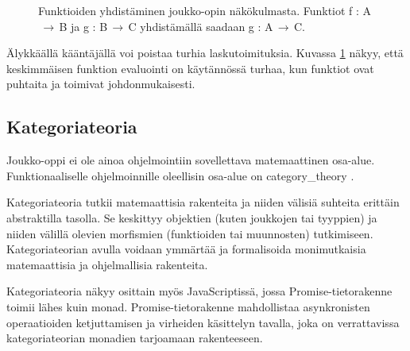 \begin{figure}[htbp]
    \vspace{10pt}
    \caption{Funktioiden yhdistäminen joukko-opin näkökulmasta. Funktiot f : A$\,\to\,$B ja g : B$\,\to\,$C yhdistämällä saadaan g : A$\,\to\,$C.}
    \label{fig:function_composition_in_sets}
\end{figure}

Älykkäällä kääntäjällä voi poistaa turhia laskutoimituksia. Kuvassa \ref{fig:function_composition_in_sets} näkyy, että keskimmäisen funktion evaluointi on käytännössä turhaa, kun funktiot ovat puhtaita ja toimivat johdonmukaisesti.



\subsection{Kategoriateoria}


Joukko-oppi ei ole ainoa ohjelmointiin sovellettava matemaattinen osa-alue. Funktionaaliselle ohjelmoinnille oleellisin osa-alue on \gls{category_theory} \cite{bartosz_category_for_progamers,promises-spec-94}.

Kategoriateoria tutkii matemaattisia rakenteita ja niiden välisiä suhteita erittäin abstraktilla tasolla. Se keskittyy objektien (kuten joukkojen tai tyyppien) ja niiden välillä olevien morfismien (funktioiden tai muunnosten) tutkimiseen. Kategoriateorian avulla voidaan ymmärtää ja formalisoida monimutkaisia matemaattisia ja ohjelmallisia rakenteita. \citep{bartosz_category_for_progamers,promises-spec-94,category_theory}

Kategoriateoria näkyy osittain myös JavaScriptissä, jossa Promise-tietorakenne toimii lähes kuin \gls{monad}. Promise-tietorakenne mahdollistaa asynkronisten operaatioiden ketjuttamisen ja virheiden käsittelyn tavalla, joka on verrattavissa kategoriateorian monadien tarjoamaan rakenteeseen. \citep{promises-spec-94,stackoverflow:why_monad}



